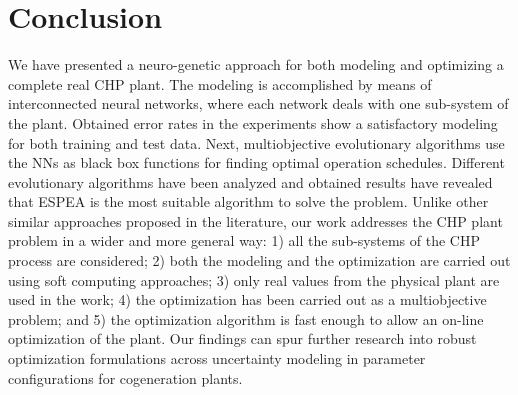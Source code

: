 \section{Conclusion}

We have presented a neuro-genetic approach for both modeling and optimizing a complete real CHP plant. The modeling is accomplished by means of interconnected neural networks, where each network deals with one sub-system of the plant. Obtained error rates in the experiments show a satisfactory modeling for both training and test data. Next, multiobjective evolutionary algorithms use the NNs as black box functions for finding optimal operation schedules. Different evolutionary algorithms have been analyzed and obtained results have revealed that ESPEA is the most suitable algorithm to solve the problem. Unlike other similar approaches proposed in the literature, our work addresses the CHP plant problem in a wider and more general way: 1) all the sub-systems of the CHP process are considered; 2) both the modeling and the optimization are carried out using soft computing approaches; 3) only real values from the physical plant are used in the work; 4) the optimization has been carried out as a multiobjective problem; and 5) the optimization algorithm is fast enough to allow an on-line optimization of the plant. Our findings can spur further research into robust optimization formulations across uncertainty modeling in parameter configurations for cogeneration plants.
 
